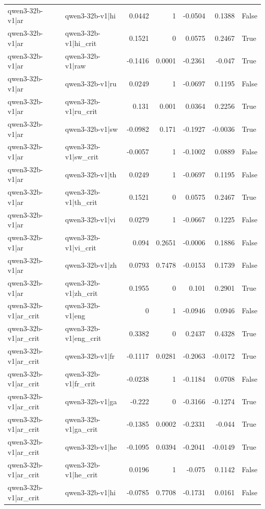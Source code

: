 \begin{table}
\begin{tabular}{l l r r r r l}
qwen3-32b-v1|ar & qwen3-32b-v1|hi & 0.0442 & 1 & -0.0504 & 0.1388 & False \\
qwen3-32b-v1|ar & qwen3-32b-v1|hi_crit & 0.1521 & 0 & 0.0575 & 0.2467 & True \\
qwen3-32b-v1|ar & qwen3-32b-v1|raw & -0.1416 & 0.0001 & -0.2361 & -0.047 & True \\
qwen3-32b-v1|ar & qwen3-32b-v1|ru & 0.0249 & 1 & -0.0697 & 0.1195 & False \\
qwen3-32b-v1|ar & qwen3-32b-v1|ru_crit & 0.131 & 0.001 & 0.0364 & 0.2256 & True \\
qwen3-32b-v1|ar & qwen3-32b-v1|sw & -0.0982 & 0.171 & -0.1927 & -0.0036 & True \\
qwen3-32b-v1|ar & qwen3-32b-v1|sw_crit & -0.0057 & 1 & -0.1002 & 0.0889 & False \\
qwen3-32b-v1|ar & qwen3-32b-v1|th & 0.0249 & 1 & -0.0697 & 0.1195 & False \\
qwen3-32b-v1|ar & qwen3-32b-v1|th_crit & 0.1521 & 0 & 0.0575 & 0.2467 & True \\
qwen3-32b-v1|ar & qwen3-32b-v1|vi & 0.0279 & 1 & -0.0667 & 0.1225 & False \\
qwen3-32b-v1|ar & qwen3-32b-v1|vi_crit & 0.094 & 0.2651 & -0.0006 & 0.1886 & False \\
qwen3-32b-v1|ar & qwen3-32b-v1|zh & 0.0793 & 0.7478 & -0.0153 & 0.1739 & False \\
qwen3-32b-v1|ar & qwen3-32b-v1|zh_crit & 0.1955 & 0 & 0.101 & 0.2901 & True \\
qwen3-32b-v1|ar_crit & qwen3-32b-v1|eng & 0 & 1 & -0.0946 & 0.0946 & False \\
qwen3-32b-v1|ar_crit & qwen3-32b-v1|eng_crit & 0.3382 & 0 & 0.2437 & 0.4328 & True \\
qwen3-32b-v1|ar_crit & qwen3-32b-v1|fr & -0.1117 & 0.0281 & -0.2063 & -0.0172 & True \\
qwen3-32b-v1|ar_crit & qwen3-32b-v1|fr_crit & -0.0238 & 1 & -0.1184 & 0.0708 & False \\
qwen3-32b-v1|ar_crit & qwen3-32b-v1|ga & -0.222 & 0 & -0.3166 & -0.1274 & True \\
qwen3-32b-v1|ar_crit & qwen3-32b-v1|ga_crit & -0.1385 & 0.0002 & -0.2331 & -0.044 & True \\
qwen3-32b-v1|ar_crit & qwen3-32b-v1|he & -0.1095 & 0.0394 & -0.2041 & -0.0149 & True \\
qwen3-32b-v1|ar_crit & qwen3-32b-v1|he_crit & 0.0196 & 1 & -0.075 & 0.1142 & False \\
qwen3-32b-v1|ar_crit & qwen3-32b-v1|hi & -0.0785 & 0.7708 & -0.1731 & 0.0161 & False \\

\end{tabular}
\end{table}
